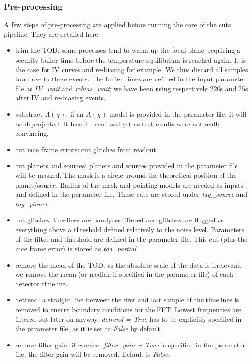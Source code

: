 \documentclass[a4paper, 11pt]{article}
\begin{document}
\subsubsection{Pre-processing}
A few steps of pre-processing are applied before running the core of the cuts pipeline. They are detailed here:
\begin{itemize}
	\item trim the TOD: some processes tend to warm up the focal plane, requiring a security buffer time before the temperature equilibrium is reached again. It is the case for IV curves and re-biasing for example. We thus discard all samples too close to these events. The buffer times are defined in the input parameter file as \emph{IV\_wait} and \emph{rebias\_wait}; we have been using respectively $220$s and $25$s after IV and re-biasing events.
	\item substract \emph{$A(\chi)$}: if an $A(\chi)$ model is provided in the parameter file, it will be deprojected. It hasn't been used yet as test results were not really convincing.
	\item cut mce frame errors: cut glitches from readout.
	\item cut planets and sources: planets and sources provided in the parameter file will be masked. The mask is a circle around the theoretical position of the planet/source. Radius of the mask and pointing models are needed as inputs and defined in the parameter file. These cuts are stored under \emph{tag\_source} and \emph{tag\_planet}.
	\item cut glitches: timelines are bandpass filtered and glitches are flagged as everything above a threshold defined relatively to the noise level. Parameters of the filter and threshold are defined in the parameter file. This cut (plus the mce frame error) is stored as \emph{tag\_partial}.
	\item remove the mean of the TOD: as the absolute scale of the data is irrelevant, we remove the mean (or median if specified in the parameter file) of each detector timeline.
	\item detrend: a straight line between the first and last sample of the timelines is removed to ensure boundary conditions for the FFT. Lowest frequencies are filtered out later on anyway. \emph{detrend = True} has to be explicitly specified in the parameter file, as it is set to \emph{False} by default.
	\item remove filter gain: if \emph{remove\_filter\_gain = True} is specified in the parameter file, the filter gain will be removed. Default is \emph{False}.

\end{itemize}
\end{document}
